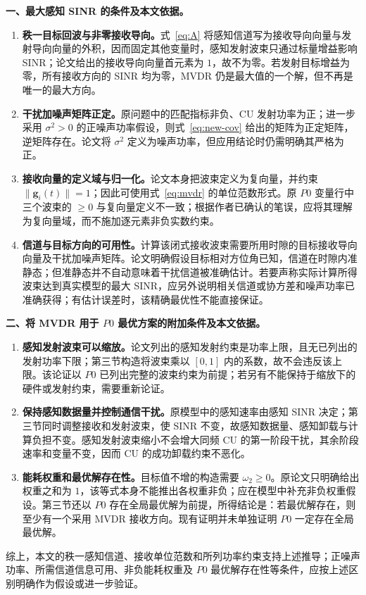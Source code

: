 \documentclass[11pt,a4paper]{ctexart}
\begin{document}
\noindent\textbf{一、最大感知 SINR 的条件及本文依据。}
\begin{enumerate}[label=\textbf{(\arabic*)},leftmargin=*]
\item \textbf{秩一目标回波与非零接收导向。}式~\eqref{eq:A} 将感知信道写为接收导向向量与发射导向向量的外积，因而固定其他变量时，感知发射波束只通过标量增益影响 SINR；论文给出的接收导向向量首元素为 $1$，故不为零。若发射目标增益为零，所有接收方向的 SINR 均为零，MVDR 仍是最大值的一个解，但不再是唯一的最大方向。
\item \textbf{干扰加噪声矩阵正定。}原问题中的匹配指标非负、CU 发射功率为正；进一步采用 $\sigma^2>0$ 的正噪声功率假设，则式~\eqref{eq:new-cov} 给出的矩阵为正定矩阵，逆矩阵存在。论文将 $\sigma^2$ 定义为噪声功率，但应用结论时仍需明确其严格为正。
\item \textbf{接收向量的定义域与归一化。}论文本身把波束定义为复向量，并约束 $\|\bm g_i(t)\|=1$；因此可使用式~\eqref{eq:mvdr} 的单位范数形式。原 $P0$ 变量行中三个波束的 $\ge0$ 与复向量定义不一致；根据作者已确认的笔误，应将其理解为复向量域，而不施加逐元素非负实数约束。
\item \textbf{信道与目标方向的可用性。}计算该闭式接收波束需要所用时隙的目标接收导向向量及干扰加噪声矩阵。论文明确假设目标相对方位角已知，信道在时隙内准静态；但准静态并不自动意味着干扰信道被准确估计。若要声称实际计算所得波束达到真实模型的最大 SINR，应另外说明相关信道或协方差和噪声功率已准确获得；有估计误差时，该精确最优性不能直接保证。
\end{enumerate}

\noindent\textbf{二、将 MVDR 用于 $P0$ 最优方案的附加条件及本文依据。}
\begin{enumerate}[label=\textbf{(\arabic*)},leftmargin=*]
\item \textbf{感知发射波束可以缩放。}论文列出的感知发射约束是功率上限，且无已列出的发射功率下限；第三节构造将波束乘以 $[0,1]$ 内的系数，故不会违反该上限。该论证以 $P0$ 已列出完整的波束约束为前提；若另有不能保持于缩放下的硬件或发射约束，需要重新论证。
\item \textbf{保持感知数据量并控制通信干扰。}原模型中的感知速率由感知 SINR 决定；第三节同时调整接收和发射波束，使 SINR 不变，故感知数据量、感知卸载与计算负担不变。感知发射波束缩小不会增大同频 CU 的第一阶段干扰，其余阶段速率和变量不变，因而 CU 的成功卸载约束不恶化。
\item \textbf{能耗权重和最优解存在性。}目标值不增的构造需要 $\omega_2\ge0$。原论文只明确给出权重之和为 $1$，该等式本身不能推出各权重非负；应在模型中补充非负权重假设。第三节还以 $P0$ 存在全局最优解为前提，所得结论是：若最优解存在，则至少有一个采用 MVDR 接收方向。现有证明并未单独证明 $P0$ 一定存在全局最优解。
\end{enumerate}

综上，本文的秩一感知信道、接收单位范数和所列功率约束支持上述推导；正噪声功率、所需信道信息可用、非负能耗权重及 $P0$ 最优解存在性等条件，应按上述区别明确作为假设或进一步验证。
\end{document}
